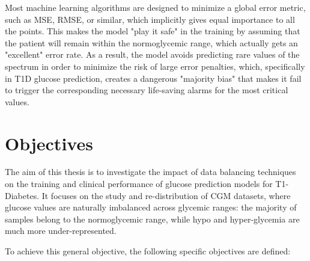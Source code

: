 Most machine learning algorithms are designed to minimize a global error metric, such as MSE, RMSE, or similar, which implicitly gives equal importance to all the points. This makes the model "play it safe" in the training by assuming that the patient will remain within the normoglycemic range, which actually gets an "excellent" error rate. As a result, the model avoids predicting rare values of the spectrum in order to minimize the risk of large error penalties, which, specifically in T1D glucose prediction, creates a dangerous "majority bias" that makes it fail to trigger the corresponding necessary life-saving alarms for the most critical values.

\section{Objectives}
\label{objetives}

The aim of this thesis is to investigate the impact of data balancing techniques on the training and clinical performance of glucose prediction models for T1-Diabetes. It focuses on the study and re-distribution of CGM datasets, where glucose values are naturally imbalanced across glycemic ranges: the majority of samples belong to the normoglycemic range, while hypo and hyper-glycemia are much more under-represented.

To achieve this general objective, the following specific objectives are defined:

